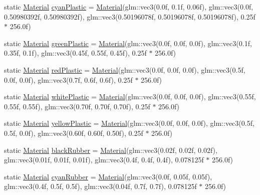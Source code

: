 \begin{DoxyCompactItemize}
\item 
static \mbox{\hyperlink{struct_material}{Material}} \mbox{\hyperlink{struct_material_a24c31c15d55457a83429418bb8745e03}{cyan\+Plastic}} = \mbox{\hyperlink{struct_material}{Material}}(glm\+::vec3(0.\+0f, 0.\+1f, 0.\+06f), glm\+::vec3(0.\+0f, 0.\+50980392f, 0.\+50980392f), glm\+::vec3(0.\+50196078f, 0.\+50196078f, 0.\+50196078f), 0.\+25f $\ast$ 256.\+0f)
\item 
static \mbox{\hyperlink{struct_material}{Material}} \mbox{\hyperlink{struct_material_abaddc1454d8d34f501be471246853856}{green\+Plastic}} = \mbox{\hyperlink{struct_material}{Material}}(glm\+::vec3(0.\+0f, 0.\+0f, 0.\+0f), glm\+::vec3(0.\+1f, 0.\+35f, 0.\+1f), glm\+::vec3(0.\+45f, 0.\+55f, 0.\+45f), 0.\+25f $\ast$ 256.\+0f)
\item 
static \mbox{\hyperlink{struct_material}{Material}} \mbox{\hyperlink{struct_material_a343f9c5d998f1db5ba50ef40376b09fe}{red\+Plastic}} = \mbox{\hyperlink{struct_material}{Material}}(glm\+::vec3(0.\+0f, 0.\+0f, 0.\+0f), glm\+::vec3(0.\+5f, 0.\+0f, 0.\+0f), glm\+::vec3(0.\+7f, 0.\+6f, 0.\+6f), 0.\+25f $\ast$ 256.\+0f)
\item 
static \mbox{\hyperlink{struct_material}{Material}} \mbox{\hyperlink{struct_material_ac7c32558480485c95f64558f7732f325}{white\+Plastic}} = \mbox{\hyperlink{struct_material}{Material}}(glm\+::vec3(0.\+0f, 0.\+0f, 0.\+0f), glm\+::vec3(0.\+55f, 0.\+55f, 0.\+55f), glm\+::vec3(0.\+70f, 0.\+70f, 0.\+70f), 0.\+25f $\ast$ 256.\+0f)
\item 
static \mbox{\hyperlink{struct_material}{Material}} \mbox{\hyperlink{struct_material_a9312d192d0bee2cbcf1e2d1d6f2d9a9e}{yellow\+Plastic}} = \mbox{\hyperlink{struct_material}{Material}}(glm\+::vec3(0.\+0f, 0.\+0f, 0.\+0f), glm\+::vec3(0.\+5f, 0.\+5f, 0.\+0f), glm\+::vec3(0.\+60f, 0.\+60f, 0.\+50f), 0.\+25f $\ast$ 256.\+0f)
\item 
static \mbox{\hyperlink{struct_material}{Material}} \mbox{\hyperlink{struct_material_a0772c33ab6f82b876232153661a64c76}{black\+Rubber}} = \mbox{\hyperlink{struct_material}{Material}}(glm\+::vec3(0.\+02f, 0.\+02f, 0.\+02f), glm\+::vec3(0.\+01f, 0.\+01f, 0.\+01f), glm\+::vec3(0.\+4f, 0.\+4f, 0.\+4f), 0.\+078125f $\ast$ 256.\+0f)
\item 
static \mbox{\hyperlink{struct_material}{Material}} \mbox{\hyperlink{struct_material_a75c93c67433d5aafd1ed76aef97950a2}{cyan\+Rubber}} = \mbox{\hyperlink{struct_material}{Material}}(glm\+::vec3(0.\+0f, 0.\+05f, 0.\+05f), glm\+::vec3(0.\+4f, 0.\+5f, 0.\+5f), glm\+::vec3(0.\+04f, 0.\+7f, 0.\+7f), 0.\+078125f $\ast$ 256.\+0f)

\end{DoxyCompactItemize}
